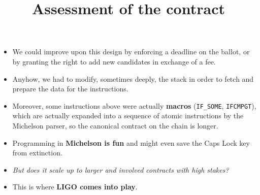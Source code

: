 \documentclass[wide]{slides}
\begin{document}
\begin{slide}
  \title{Assessment of the contract}

  \begin{itemize}

    \item We could improve upon this design by enforcing a deadline on
      the ballot, or by granting the right to add new candidates in
      exchange of a fee.

    \item Anyhow, we had to modify, sometimes deeply, the stack in
      order to fetch and prepare the data for the instructions.

    \item Moreover, some instructions above were actually
      \textbf{macros} (\texttt{IF\_SOME}, \texttt{IFCMPGT}), which are
      actually expanded into a sequence of atomic instructions by the
      Michelson parser, so the canonical contract on the chain is
      longer.

    \item Programming in \textbf{Michelson is fun} and might even save
      the Caps Lock key from extinction.

    \item \emph{But does it scale up to larger and involved contracts
      with high stakes?}

    \item This is where \textbf{LIGO comes into play}.

  \end{itemize}

\end{slide}
\end{document}
